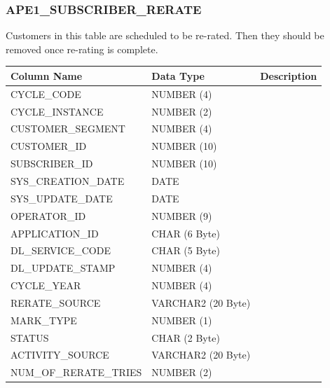 \documentclass[12pt,twoside]{article}
\begin{document}
\normalsize
\subsubsection{APE1\_SUBSCRIBER\_RERATE}
\label{sec-8-3-8}

   Customers in this table are scheduled to be re-rated. Then they should be removed once re-rating is complete.
\scriptsize

\begin{center}
\begin{tabular}{lll}
\hline
 \textbf{Column Name}    &  \textbf{Data Type}  &  Description  \\
\hline
 CYCLE\_CODE             &  NUMBER (4)          &               \\
 CYCLE\_INSTANCE         &  NUMBER (2)          &               \\
 CUSTOMER\_SEGMENT       &  NUMBER (4)          &               \\
 CUSTOMER\_ID            &  NUMBER (10)         &               \\
 SUBSCRIBER\_ID          &  NUMBER (10)         &               \\
 SYS\_CREATION\_DATE     &  DATE                &               \\
 SYS\_UPDATE\_DATE       &  DATE                &               \\
 OPERATOR\_ID            &  NUMBER (9)          &               \\
 APPLICATION\_ID         &  CHAR (6 Byte)       &               \\
 DL\_SERVICE\_CODE       &  CHAR (5 Byte)       &               \\
 DL\_UPDATE\_STAMP       &  NUMBER (4)          &               \\
 CYCLE\_YEAR             &  NUMBER (4)          &               \\
 RERATE\_SOURCE          &  VARCHAR2 (20 Byte)  &               \\
 MARK\_TYPE              &  NUMBER (1)          &               \\
 STATUS                  &  CHAR (2 Byte)       &               \\
 ACTIVITY\_SOURCE        &  VARCHAR2 (20 Byte)  &               \\
 NUM\_OF\_RERATE\_TRIES  &  NUMBER (2)          &               \\
\hline
\end{tabular}
\end{center}
\end{document}
